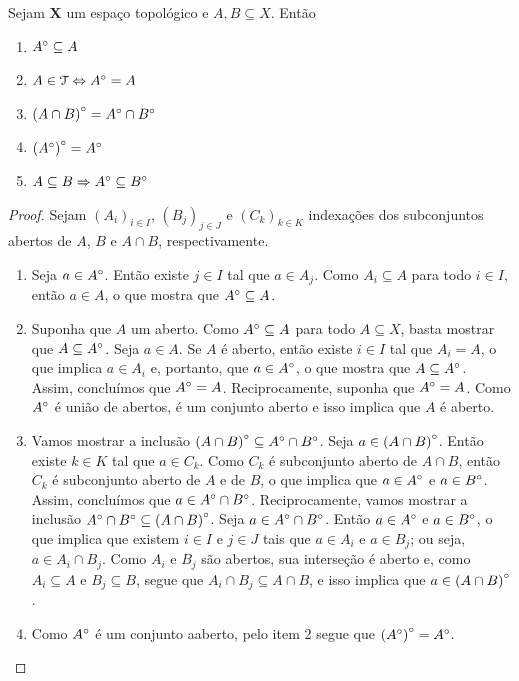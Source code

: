\begin{prop}
	Sejam $\bm X$ um espaço topológico e $A,B \subseteq X$. Então
	\begin{enumerate}
	\item ${A}^\circ \subseteq A$
	\item $A \in \mathcal{T} \Leftrightarrow {A}^\circ=A$
	\item ${(A \cap B)}^\circ = {A}^\circ \cap {B}^\circ$
	\item ${({A}^\circ)}^\circ = {A}^\circ$
	\item $A \subseteq B \Rightarrow {A}^\circ \subseteq {B}^\circ$
	\end{enumerate}
\end{prop}
\begin{proof} Sejam $(A_i)_{i \in I}$, $(B_j)_{j \in J}$ e $(C_k)_{k \in K}$ indexações dos subconjuntos abertos de $A$, $B$ e $A \cap B$, respectivamente.
	\begin{enumerate}
	\item Seja $a \in {A}^\circ$. Então existe $j \in I$ tal que $a \in A_j$. Como $A_i \subseteq A$ para todo $i \in I$, então $a \in A$, o que mostra que ${A}^\circ \subseteq A$.
	
	\item Suponha que $A$ um aberto. Como ${A}^\circ \subseteq A$ para todo $A \subseteq X$, basta mostrar que $A \subseteq {A}^\circ$. Seja $a \in A$.	Se $A$ é aberto, então existe $i \in I$ tal que $A_i = A$, o que implica $a \in A_i$ e, portanto, que $a \in {A}^\circ$, o que mostra que $A \subseteq {A}^\circ$. Assim, concluímos que ${A}^\circ=A$. Reciprocamente, suponha que ${A}^\circ=A$. Como ${A}^\circ$ é união de abertos, é um conjunto aberto e isso implica que $A$ é aberto.
	
	\item Vamos mostrar a inclusão ${(A \cap B)}^\circ \subseteq {A}^\circ \cap {B}^\circ$. Seja $a \in {(A \cap B)}^\circ$. Então existe $k \in K$ tal que $a \in C_k$. Como $C_k$ é subconjunto aberto de $A \cap B$, então $C_k$ é subconjunto aberto de $A$ e de $B$, o que implica que $a \in {A}^\circ$ e $a \in {B}^\circ$. Assim, concluímos que $a \in {A}^\circ \cap {B}^\circ$. Reciprocamente, vamos mostrar a inclusão ${A}^\circ \cap {B}^\circ \subseteq {(A \cap B)}^\circ$. Seja $a \in {A}^\circ \cap {B}^\circ$. Então $a \in {A}^\circ$ e $a \in {B}^\circ$, o que implica que existem $i \in I$ e $j \in J$ tais que $a \in A_i$ e $a \in B_j$; ou seja, $a \in A_i \cap B_j$. Como $A_i$ e $B_j$ são abertos, sua interseção é aberto e, como $A_i \subseteq A$ e $B_j \subseteq B$, segue que $A_i \cap B_j \subseteq A \cap B$, e isso implica que $a \in {(A \cap B)}^\circ$.
	
	\item Como ${A}^\circ$ é um conjunto aaberto, pelo item 2 segue que ${({A}^\circ)}^\circ = {A}^\circ$.
\qedhere	
	\end{enumerate}
\end{proof}

